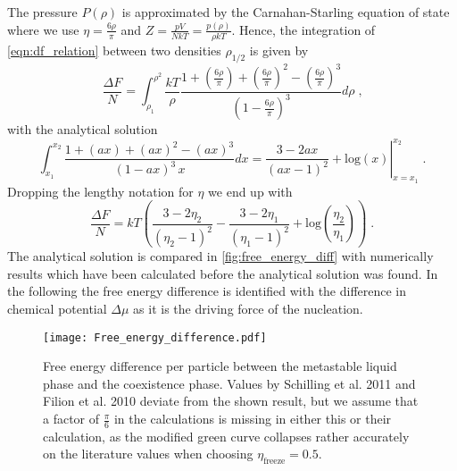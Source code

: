 The pressure $P(\rho)$ is approximated by the Carnahan-Starling equation of state where we use $\eta = \frac{6 \rho }{\pi}$ and $Z=\frac{pV}{NkT} = \frac{p(\rho)}{\rho kT}$. Hence, the integration of \autoref{eqn:df_relation} between two densities $\rho_{1/2}$ is given by
\begin{equation}
\frac{\Delta F}{N} = \int_{\rho_1}^{\rho^2} \frac{kT}{\rho} \frac{1+\left( \frac{6 \rho}{\pi}\right) +\left( \frac{6 \rho}{\pi}\right)^2 - \left( \frac{6 \rho}{\pi}\right)^3}{\left( 1 - \frac{6 \rho}{\pi}\right)^3} d\rho \; \text{,}
\end{equation}
with the analytical solution
\begin{equation}
\int_{x_1}^{x_2} \frac{1+(ax) +(ax)^2 - (ax)^3 }{( 1 - ax )^3 \,  x} dx = \left. \frac{3-2ax}{(ax-1)^2} + \text{log}(x) \right|_{x=x_1}^{x_2} \; \text{.}
\end{equation}
Dropping the lengthy notation for $\eta$ we end up with
\begin{equation}
\frac{\Delta F}{N} = kT \left(  \frac{3-2 \eta_2}{(\eta_2 - 1)^2} - \frac{3-2 \eta_1}{(\eta_1 - 1)^2} + \text{log}\left( \frac{\eta_2}{\eta_1} \right) \right) \; \text{.}
\end{equation}
The analytical solution is compared in \autoref{fig:free_energy_diff} with numerically results which have been calculated before the analytical solution was found. In the following the free energy difference is identified with the difference in chemical potential $\Delta \mu$ as it is the driving force of the nucleation.\\

\begin{figure}[h]
\centering
\texttt{[image: Free\_energy\_difference.pdf]}
\caption[Free energy difference between fluid and solid phase]{Free energy difference per particle between the metastable liquid phase and the coexistence phase. Values by Schilling et al. 2011\cite{Schilling2011} and Filion et al. 2010\cite{Filion2010a} deviate from the shown result, but we assume that a factor of $\frac{\pi}{6}$ in the calculations is missing in either this or their calculation, as the modified green curve collapses rather accurately on the literature values when choosing $\eta_{\text{freeze}}=0.5$.}
\label{fig:free_energy_diff}
\end{figure}

